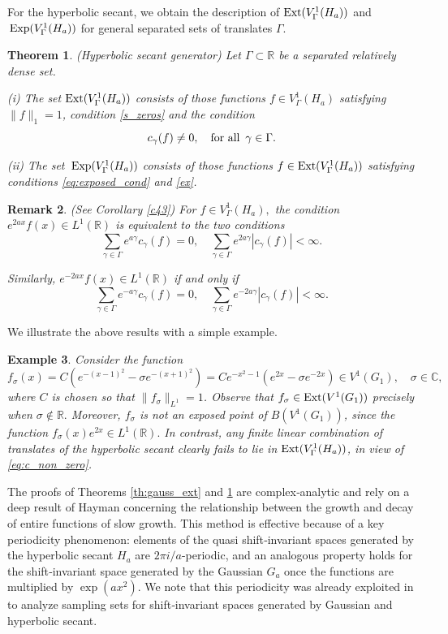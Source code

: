 \documentclass[12pt]{amsart}
\numberwithin{equation}{section}
\theoremstyle{plain}
\newtheorem{theorem}{Theorem}[section]
\newtheorem{remark}[theorem]{Remark}
\newtheorem{example}[theorem]{Example}
\theoremstyle{definition}
\newcommand{\R}{{\mathbb R}} \newcommand{\Q}{{\mathbb Q}} \newcommand{\Z}{{\mathbb Z}} \newcommand{\N}{{\mathbb N}}
\newcommand{\Cc}{{\mathbb C}}
\newcommand{\ext}{{\rm Ext}}
\newcommand{\expo}{\,{\rm Exp}}
\begin{document}
For the hyperbolic secant, we obtain the description of $\ext(V^1_{\Gamma}(H_a))$ and $\expo(V^1_{\Gamma}(H_a))$  for general separated sets of translates $\Gamma.$ 

\begin{theorem}\label{th:hyp_ext}{\rm (Hyperbolic secant generator)} Let $\Gamma\subset\R$ be a separated relatively dense set.

 {\rm (i)}  The set $\ext(V_\Gamma^1(H_a))$ consists  of those functions $f\in V_\Gamma^1(H_a)$ satisfying $\|f\|_{1} = 1$, condition \eqref{s_zeros} and the condition
\begin{equation}\label{eq:c_non_zero}
    c_\gamma(f) \neq 0, \quad \text{for all \,} \gamma \in \Gamma.
\end{equation}

{\rm (ii)} The set  $\expo(V^1_{\Gamma}(H_a))$ consists of those functions  $f\in \ext(V^1_{\Gamma}(H_a))$  satisfying conditions \eqref{eq:exposed_cond} and \eqref{ex}.
\end{theorem}

\begin{remark}\label{rem} {\rm (See Corollary \ref{c43})} For $f\in V^1_\Gamma(H_a),$ the condition $e^{2ax}f(x)\in L^1(\R)$ is equivalent to the two conditions
  $$\sum_{\gamma\in\Gamma}e^{a\gamma}c_\gamma(f)=0,\quad \sum_{\gamma\in\Gamma}e^{2a\gamma}|c_\gamma(f)|<\infty.$$
  
 Similarly,  $e^{-2ax}f(x)\in L^1(\R)$ if and only if
  $$\sum_{\gamma\in\Gamma}e^{-a\gamma}c_\gamma(f)=0, \quad \sum_{\gamma\in\Gamma}e^{-2a\gamma}|c_\gamma(f)|<\infty.$$
  \end{remark}

We illustrate the above results with a simple example.

\begin{example}
    Consider the function $$f_\sigma(x) = C(e^{-(x-1)^2} - \sigma e^{-(x+1)^2}) = Ce^{-x^2-1}(e^{2x}-\sigma e^{-2x})\in V^1(G_1),\quad \sigma\in\Cc,$$ where $C$ is chosen so that $\|f_{\sigma}\|_{L^1} =1$. Observe that $f_\sigma \in \ext(V^1(G_1))$ precisely when  $\sigma \notin \R.$
    Moreover, $f_\sigma$ is not an exposed point of $B(V^1(G_1))$, since the function $f_\sigma(x) e^{2x} \in L^1(\R).$
    In contrast,  any finite linear combination of translates of the hyperbolic secant clearly fails to lie in $\ext(V^1_{\Gamma}(H_a))$, in view of \eqref{eq:c_non_zero}. 
\end{example}

The proofs of Theorems \ref{th:gauss_ext} and \ref{th:hyp_ext} are complex‑analytic and rely on a deep result of Hayman  \cite{MR111839} concerning the relationship between the growth and decay of entire functions of slow growth. This method is effective because of a key periodicity phenomenon: elements of the quasi shift‑invariant spaces generated by the hyperbolic secant $H_a$ are $2\pi i/a$-periodic, and an analogous property holds for the shift‑invariant space generated by the Gaussian $G_a$ once the functions are multiplied by $\exp(ax^2).$
 We note that this periodicity was already exploited in \cite{MR4047939} to analyze sampling sets for shift‑invariant spaces generated by Gaussian and hyperbolic secant.
 
\end{document}
